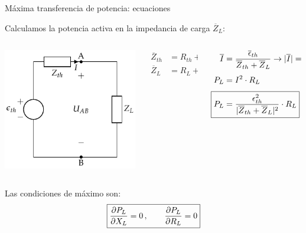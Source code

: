 \documentclass[aspectratio=169, usenames,svgnames,dvipsnames]{beamer}
\begin{document}
\begin{frame}{Máxima transferencia de potencia: \hspace{3mm}ecuaciones}

    \vspace{2mm}
    Calculamos la \alert{potencia activa en la impedancia} de carga \(\overline{Z}_L\):
    \begin{columns}
    \begin{column}{0.3\columnwidth}
    \begin{center}
        \includegraphics[height=0.45\textheight]{../figs/EquivalenteThevenin0.pdf}
    \end{center}
    \end{column}
    
    \begin{column}{0.2\columnwidth}
    \begin{align*}
      \overline{Z}_{th} &= R_{th} + jX_{th}\\[3pt]
      \overline{Z}_L &= R_L + jX_L\\
    \end{align*}
    \end{column}
    
    \begin{column}{0.4\columnwidth}
    \begin{align*}
        \overline{I} &= \frac{\overline{\epsilon}_{th}}{\overline{Z}_{th} + \overline{Z}_L}
        \rightarrow 
        |\overline{I}| = \frac{\epsilon_{th}}{|\overline{Z}_{th} + \overline{Z}_L|}\\[3pt]
        P_L &= I^2 \cdot R_L\\[3pt]
        \Aboxed{P_L &= \frac{\epsilon^2_{th}}{|\overline{Z}_{th} + \overline{Z}_L|^2} \cdot R_L}
    \end{align*}
    \end{column}
    \end{columns}

    \vspace{5mm}
    Las \alert{condiciones} de \alert{máximo} son: 
    \[
      \boxed{%
        \diffp{P_L}{X_L} = 0 \, , \qquad%
        \diffp{P_L}{R_L} = 0%
      }
    \]
\end{frame}
\end{document}
